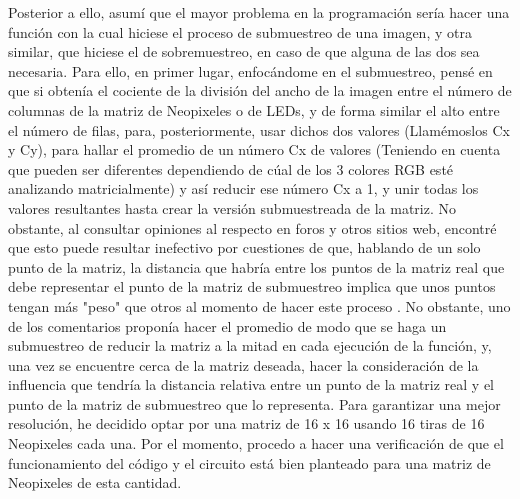 \documentclass{article}
\begin{document}
 Posterior a ello, asumí que el mayor problema en la programación sería hacer una función con la cual hiciese el proceso de submuestreo de una imagen, y otra similar, que hiciese el de sobremuestreo, en caso de que alguna de las dos sea necesaria. Para ello, en primer lugar, enfocándome en el submuestreo, pensé en que si obtenía el cociente de la división del ancho de la imagen entre el número de columnas de la matriz de Neopixeles o de LEDs, y de forma similar el alto entre el número de filas, para, posteriormente, usar dichos dos valores (Llamémoslos Cx y Cy), para hallar el promedio de un número Cx de valores (Teniendo en cuenta que pueden ser diferentes dependiendo de cúal de los 3 colores RGB esté analizando matricialmente) y así reducir ese número Cx a 1, y unir todas los valores resultantes hasta crear la versión submuestreada de la matriz. No obstante, al consultar opiniones al respecto en foros y otros sitios web, encontré que esto puede resultar inefectivo por cuestiones de que, hablando de un solo punto de la matriz, la distancia que habría entre los puntos de la matriz real que debe representar el punto de la matriz de submuestreo implica que unos puntos tengan más "peso" que otros al momento de hacer este proceso \cite{AplicarRemuestreo}. No obstante, uno de los comentarios \cite{Comm_ReduImg} proponía hacer el promedio de modo que se haga un submuestreo de reducir la matriz a la mitad en cada ejecución de la función, y, una vez se encuentre cerca de la matriz deseada, hacer la consideración de la influencia que tendría la distancia relativa entre un punto de la matriz real y el punto de la matriz de submuestreo que lo representa. Para garantizar una mejor resolución, he decidido optar por una matriz de 16 x 16 usando 16 tiras de 16 Neopixeles cada una. Por el momento, procedo a hacer una verificación de que el funcionamiento del código y el circuito está bien planteado para una matriz de Neopixeles de esta cantidad.
\end{document}
